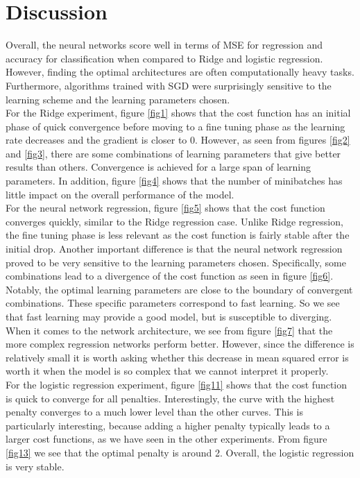 \documentclass[notitlepage, reprint, nofootinbib]{revtex4-1}
\begin{document}
\section{Discussion}
Overall, the neural networks score well in terms of MSE for regression and accuracy for classification when compared to Ridge and logistic regression. However, finding the optimal architectures are often computationally heavy tasks. Furthermore, algorithms trained with SGD were surprisingly sensitive to the learning scheme and the learning parameters chosen. \\[2mm]
For the Ridge experiment, figure \ref{fig1} shows that the cost function has an initial phase of quick convergence before moving to a fine tuning phase as the learning rate decreases and the gradient is closer to 0. However, as seen from figures \ref{fig2} and \ref{fig3}, there are some combinations of learning parameters that give better results than others. Convergence is achieved for a large span of learning parameters. In addition, figure \ref{fig4} shows that the number of minibatches has little impact on the overall performance of the model. \\[2mm]
For the neural network regression, figure \ref{fig5} shows that the cost function converges quickly, similar to the Ridge regression case. Unlike Ridge regression, the fine tuning phase is less relevant as the cost function is fairly stable after the initial drop. Another important difference is that the neural network regression proved to be very sensitive to the learning parameters chosen. Specifically, some combinations lead to a divergence of the cost function as seen in figure \ref{fig6}. Notably, the optimal learning parameters are close to the boundary of convergent combinations. These specific parameters correspond to fast learning. So we see that fast learning may provide a good model, but is susceptible to diverging. \\[2mm]
When it comes to the network architecture, we see from figure \ref{fig7} that the more complex regression networks perform better. However, since the difference is relatively small it is worth asking whether this decrease in mean squared error is worth it when the model is so complex that we cannot interpret it properly.  \\[2mm]
For the logistic regression experiment, figure \ref{fig11} shows that the cost function is quick to converge for all penalties. Interestingly, the curve with the highest penalty converges to a much lower level than the other curves. This is particularly interesting, because adding a higher penalty typically leads to a larger cost functions, as we have seen in the other experiments. From figure \ref{fig13} we see that the optimal penalty is around 2. Overall, the logistic regression is very stable.\\[2mm]
\end{document}
